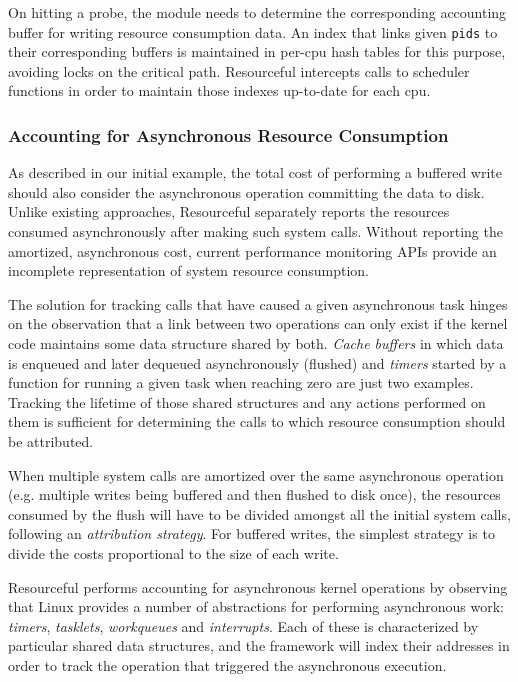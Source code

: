 \documentclass[letterpaper,twocolumn,10pt]{article}
\newcommand{\pname}{Resourceful}
\begin{document}
On hitting a probe, the module needs to determine the corresponding accounting
buffer for writing resource consumption data. An index that links given
\texttt{pids} to their corresponding buffers is maintained in per-cpu hash
tables for this purpose, avoiding locks on the critical path. \pname{ }
intercepts calls to scheduler functions in order to maintain those indexes
up-to-date for each cpu.

\subsubsection*{Accounting for Asynchronous Resource Consumption}
As described in our initial example, the total cost of performing a buffered
write should also consider the asynchronous operation committing the data to
disk. Unlike existing approaches, \pname{} separately reports the resources
consumed asynchronously after making such system calls.  Without reporting the
amortized, asynchronous cost, current performance monitoring APIs provide an
incomplete representation of system resource consumption.

The solution for tracking calls that have caused a given asynchronous task
hinges on the observation that a link between two operations can only exist if
the kernel code maintains some data structure shared by both. \textit{Cache
buffers} in which data is enqueued and later dequeued asynchronously (flushed)
and \textit{timers} started by a function for running a given task when reaching
zero are just two examples. Tracking the lifetime of those shared structures and
any actions performed on them is sufficient for determining the calls to which
resource consumption should be attributed.

When multiple system calls are amortized over the same asynchronous operation
(e.g. multiple writes being buffered and then flushed to disk once),
the resources consumed by the flush will have to be divided amongst all the
initial system calls, following an \textit{attribution strategy}. For buffered writes,
the simplest strategy is to divide the costs proportional to the size of each
write.

\pname{ }performs accounting for asynchronous kernel operations by observing
that Linux provides a number of abstractions for performing asynchronous work:
\emph{timers}, \emph{tasklets}, \emph{workqueues} and \emph{interrupts}. Each of
these is characterized by particular shared data structures, and the framework
will index their addresses in order to track the operation that triggered the
asynchronous execution.
\end{document}
